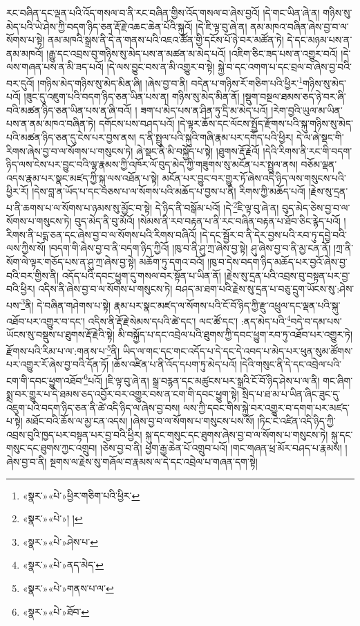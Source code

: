 རང་བཞིན་དང་ལྡན་པའི་འོད་གསལ་བ་ནི་རང་བཞིན་གྱིས་འོད་གསལ་བ་ཞེས་བྱའོ། །དེ་གང་ཡིན་ཞེ་ན། གཉིས་སུ་མེད་པའི་ཡེ་ཤེས་ཀྱི་བདག་ཉིད་ཅན་རྡོ་རྗེ་འཆང་ཆེན་པོའི་སྐུའོ། །དེ་ཇི་ལྟ་བུ་ཞེ་ན། ནམ་མཁའ་བཞིན་ཞེས་བྱ་བ་ལ་སོགས་པ་སྟེ། ནམ་མཁའི་སྒྲས་ནི་དེ་ན་གནས་པའི་འཇའ་ཚོན་གྱི་དངོས་པོ་ཉེ་བར་མཚོན་ཏེ། དེ་དང་མཉམ་པས་ན་ནམ་མཁའོ། །རྒྱུ་དང་འབྲས་བུ་གཉིས་སུ་མེད་པས་ན་མཚན་མ་མེད་པའོ། །འཇིག་ཅིང་ཟད་པས་ན་འགྱུར་བའོ། །དེ་ལས་གཞན་པས་ན་མི་ཟད་པའོ། །དེ་ལས་བྱུང་བས་ན་མི་འགྱུར་བ་སྟེ། སྐྱེ་བ་དང་འགག་པ་དང་བྲལ་བ་ཞེས་བྱ་བའི་བར་དུའོ། །གཉིས་མེད་གཉིས་སུ་མེད་མིན་ཞི། །ཞེས་བྱ་བ་ནི། བདེན་པ་གཉིས་རོ་གཅིག་པའི་ཕྱིར་\footnote{«སྣར་»«པེ་»ཕྱིར་གཅིག་པའི་ཕྱིར་}གཉིས་སུ་མེད་པའོ། །ཟུང་དུ་འཇུག་པའི་བདག་ཉིད་ཅན་ཡིན་པས་ན། གཉིས་སུ་མེད་མིན་ནོ། །སྡུག་བསྔལ་ཐམས་ཅད་ཉེ་བར་ཞི་བའི་མཚན་ཉིད་ཅན་ཡིན་པས་ན་ཞི་བའོ། །
ཟག་པ་མེད་པས་ན་ཤིན་ཏུ་དྲི་མ་མེད་པའོ། །རེག་བྱའི་ཡུལ་མ་ཡིན་པས་ན་ནམ་མཁའ་བཞིན་ཏེ། དགོངས་པས་བཤད་པའོ། །དེ་ལྟར་ཆོས་དང་ལོངས་སྤྱོད་རྫོགས་པའི་སྐུ་གཉིས་སུ་མེད་པའི་མཚན་ཉིད་ཅན་དུ་ངེས་པར་བྱས་ནས། ད་ནི་སྤྲུལ་པའི་སྐུའི་གཞི་རྣམ་པར་དགོད་པའི་ཕྱིར། དེ་ལ་ཞེ་སྡང་གི་རིགས་ཞེས་བྱ་བ་ལ་སོགས་པ་གསུངས་ཏེ། ཞེ་སྡང་ནི་མི་བསྐྱོད་པ་སྟེ། །ཐུགས་རྡོ་རྗེའོ། །དེའི་རིགས་ནི་རང་གི་བདག་ཉིད་ལས་ངེས་པར་བྱུང་བའི་ལྷ་རྣམས་ཀྱི་འཁོར་ལོ་བུད་མེད་ཀྱི་གཟུགས་སུ་མངོན་པར་སྤྲུལ་ནས། བཅོམ་ལྡན་འདས་རྣམ་པར་སྣང་མཛད་ཀྱི་སྐུ་ལས་འཐོན་པ་སྟེ། མངོན་པར་བྱུང་བར་གྱུར་ཏོ་ཞེས་འདི་ཉིད་ལས་གསུངས་པའི་ཕྱིར་རོ། །དེས་བླ་ན་ཡོད་པ་དང་བཅས་པ་ལ་སོགས་པའི་མཆོད་པ་བྱས་པ་ནི། རིགས་ཀྱི་མཆོད་པའོ། །རྗེས་སུ་དྲན་པ་ནི་ཆགས་པ་ལ་སོགས་པ་ཉམས་སུ་མྱོང་བ་སྟེ། དེ་ཉིད་ནི་བསྒོམ་པའོ། །དེ་\footnote{«སྣར་»«པེ་»། །}ཇི་ལྟ་བུ་ཞེ་ན། བུད་མེད་ཅེས་བྱ་བ་ལ་སོགས་པ་གསུངས་ཏེ། བུད་མེད་ནི་བུ་མོའོ། །སེམས་ནི་རབ་བརྟན་པ་ནི་རང་བཞིན་བརྟན་པ་ཐོབ་ཅིང་རྙེད་པའོ། །རིགས་ནི་པདྨ་ཅན་དང་ཞེས་བྱ་བ་ལ་སོགས་པའི་རིགས་བཞིའོ། །དེ་དང་སྦྱོར་བ་ནི་དེར་བྱས་པའི་རབ་ཏུ་དབྱེ་བའི་ལས་ཀྱིས་སོ། །བདག་གི་ཞེས་བྱ་བ་ནི་བདག་ཉིད་ཀྱིའོ། །ཁུ་བ་ནི་ཤུ་ཀྲ་ཞེས་བྱ་སྟེ། ཤུ་ཞེས་བྱ་བ་ནི་མྱ་ངན་ནོ། །ཀྲ་ནི་སོག་ལེ་ལྟར་གཅོད་པས་ན་ཤུ་ཀྲ་ཞེས་བྱ་སྟེ། མཆོག་ཏུ་དགའ་བའོ། །ཁུ་བ་དེས་བདག་ཉིད་མཆོད་པར་བྱའོ་ཞེས་བྱ་བའི་བར་གྱིས་ནི། འདོད་པའི་དབང་ཕྱུག་དུ་གསལ་བར་སྟོན་པ་ཡིན་ནོ། །རྗེས་སུ་དྲན་པའི་འབྲས་བུ་བསྟན་པར་བྱ་བའི་ཕྱིར། འདིས་ནི་ཞེས་བྱ་བ་ལ་སོགས་པ་གསུངས་ཏེ། བཤད་མ་ཐག་པའི་རྗེས་སུ་དྲན་པ་བཅུ་དྲུག་ཡོངས་སུ་:ཤེས་པས་\footnote{«སྣར་»«པེ་»ཤེས་པ་}ནི། དེ་བཞིན་གཤེགས་པ་སྟེ། རྣམ་པར་སྣང་མཛད་ལ་སོགས་པའི་ངོ་བོ་ཉིད་ཀྱི་རྫུ་འཕྲུལ་དང་ལྡན་པའི་སྐུ་འཐོབ་པར་འགྱུར་བ་དང་། འདིས་ནི་རྡོ་རྗེ་སེམས་དཔའི་ཚེ་དང་། ལང་ཚོ་དང་། :ནད་མེད་པའི་\footnote{«སྣར་»«པེ་»ནད་མེད་}བདེ་བ་དམ་པས་ཡོངས་སུ་བསྡུས་པ་ཐུགས་རྡོ་རྗེའི་སྟེ། མི་བསྐྱོད་པ་དང་འབྲེལ་པའི་ཐུགས་ཀྱི་དབང་ཕྱུག་རབ་ཏུ་འཐོབ་པར་འགྱུར་ཏེ། རྫོགས་པའི་རིམ་པ་ལ་:གནས་པ་\footnote{«སྣར་»«པེ་»གནས་པ་ལ་}ནི། ཡིད་ལ་གང་དང་གང་འདོད་པ་དེ་དང་དེ་འབད་པ་མེད་པར་ཕུན་སུམ་ཚོགས་པར་འགྱུར་རོ་ཞེས་བྱ་བའི་དོན་ཏོ། །ཆོས་འཛིན་པ་ནི་འོད་དཔག་ཏུ་མེད་པའོ། །དེའི་གསུང་ནི་དེ་དང་འབྲེལ་པའི་ངག་གི་དབང་ཕྱུག་འཐོབ་\footnote{«སྣར་»«པེ་»ཐོབ་}པའོ། །ཇི་ལྟ་བུ་ཞེ་ན། སྒྲ་བརྙན་དང་མཚུངས་པར་སྒྲའི་ངོ་བོ་ཉིད་ཤེས་པ་ལ་ནི། གང་ཞིག་སྨྲ་བར་གྱུར་པ་དེ་ཐམས་ཅད་འབྱོར་བར་འགྱུར་བས་ན་ངག་གི་དབང་ཕྱུག་སྟེ། སྲིད་པ་ཐ་མ་པ་ཡིན་ཞིང་ཟུང་དུ་འཇུག་པའི་བདག་ཉིད་ཅན་ནི་ཚེ་འདི་ཉིད་ལ་ཞེས་བྱ་བས། ལས་ཀྱི་དབང་གིས་སྐྱེ་བར་འགྱུར་བ་དགག་པར་མཛད་པ་སྟེ། མཐོང་བའི་ཆོས་ལ་མྱ་ངན་འདས། །ཞེས་བྱ་བ་ལ་སོགས་པ་གསུངས་པས་སོ། །ཏིང་ངེ་འཛིན་འདི་ཉིད་ཀྱི་འབྲས་བུའི་ཁྱད་པར་བསྟན་པར་བྱ་བའི་ཕྱིར། སྐུ་དང་གསུང་དང་ཐུགས་ཞེས་བྱ་བ་ལ་སོགས་པ་གསུངས་ཏེ། སྐུ་དང་གསུང་དང་ཐུགས་ཀྱང་འགྲུབ། །ཅེས་བྱ་བ་ནི། ཕྱག་རྒྱ་ཆེན་པོ་འགྲུབ་པའོ། །གང་གཞན་ཕྲ་མོར་བཤད་པ་རྣམས། །ཞེས་བྱ་བ་ནི། སྔགས་ལ་རྗེས་སུ་གཞོལ་བ་རྣམས་ལ་དེ་དང་འབྲེལ་པ་གཞན་དག་སྟེ། 